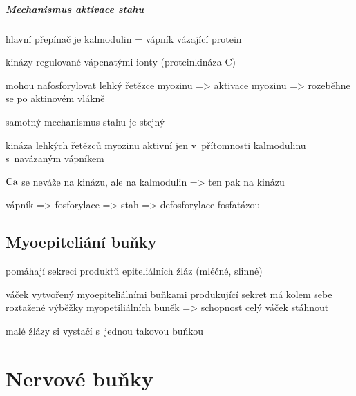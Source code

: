 \documentclass[DIV=8]{scrreprt}
\begin{document}
\paragraph{Mechanismus aktivace stahu}
\begin{myItemize}[nosep]
    \item hlavní přepínač je kalmodulin = vápník vázající protein
    \item kinázy regulované vápenatými ionty (proteinkináza C)
\begin{myItemize}[nosep]
    \item mohou nafosforylovat lehký řetězce myozinu => aktivace myozinu => rozeběhne se po aktinovém vlákně
\end{myItemize}

    \item samotný mechanismus stahu je stejný
    \item kináza lehkých řetězců myozinu aktivní jen v přítomnosti kalmodulinu s navázaným vápníkem
\begin{myItemize}[nosep]
    \item \(\ce{Ca}\) se neváže na kinázu, ale na kalmodulin => ten pak na kinázu
\end{myItemize}

    \item vápník => fosforylace => stah => defosforylace fosfatázou
\end{myItemize}



\section{Myoepiteliání buňky} \label{Myoepiteliání buňky} \FloatBarrier


\begin{myItemize}[nosep]
    \item pomáhají sekreci produktů epiteliálních žláz (mléčné, slinné)
    \item váček vytvořený myoepiteliálními buňkami produkující sekret má kolem sebe roztažené výběžky myopetiliálních buněk => schopnost celý váček stáhnout
    \item malé žlázy si vystačí s jednou takovou buňkou
\end{myItemize}



\chapter{Nervové buňky} \label{Nervové buňky}
\end{document}
